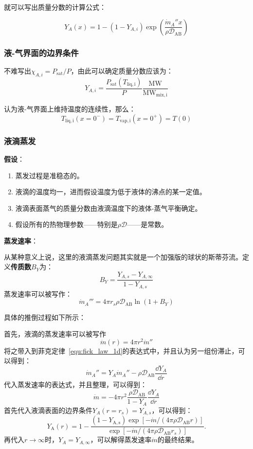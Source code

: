 就可以写出质量分数的计算公式：

\begin{equation}
    Y_A(x) = 1 - (1-Y_{A,i})\exp\left(\frac{\dot{m}_A'' x}{\rho\mathcal{D}_\mathrm{AB}}\right)
\end{equation}

\subsubsection{液-气界面的边界条件}

不难写出\(\chi_{A,i} = P_\mathrm{sat}/P\)，由此可以确定质量分数应该为：
\begin{equation}
    Y_{A,i} = \frac{P_\mathrm{sat}(T_\mathrm{liq, i})}{P}\frac{\mathrm{MW}}{\mathrm{MW}_\mathrm{mix, i}}
\end{equation}

认为液-气界面上维持温度的连续性，那么：
\[
    T_\mathrm{liq,i}(x=0^-) = T_\mathrm{vap, i}(x=0^+) = T(0)
\]


\subsubsection{液滴蒸发}

\textbf{假设}：
{\scriptsize
    \begin{enumerate}
        \item 蒸发过程是准稳态的。
        \item 液滴的温度均一，进而假设温度为低于液体的沸点的某一定值。
        \item 液滴表面蒸气的质量分数由液滴温度下的液体-蒸气平衡确定。
        \item 假设所有的热物理参数——特别是\(\rho\mathcal{D}\)——是常数。
    \end{enumerate}
}

\textbf{蒸发速率}：

从某种意义上说，这里的液滴蒸发问题其实就是一个加强版的球状的斯蒂芬流。定义\textbf{传质数}\(B_Y\)为：
\begin{equation}
    B_Y = \frac{Y_{A,s}-Y_{A,\infty}}{1 - Y_{A,s}}
\end{equation}
蒸发速率可以被写作：
\begin{equation}\label{equ:evo_rate}
    \dot{m}_A''' = {4\pi r_s \rho \mathcal{D}_\mathrm{AB}}\ln({1+B_Y})
\end{equation}

具体的推倒过程如下所示：

{
    \scriptsize\color{gray}
    首先，液滴的蒸发速率可以被写作
    \[
        \dot{m}(r) = 4\pi r^2 \dot{m}''
    \]
    将之带入到菲克定律~\ref{equ:fick_law_1d}的表达式中，并且认为另一组份滞止，可以得到：
    \[
        \dot{m}_A'' = Y_A\dot{m}_A'' - \rho\mathcal{D}_\mathrm{AB}\frac{\dd Y_A}{\dd r}
    \]
    代入蒸发速率的表达式，并且整理，可以得到：
    \[
        \dot{m}=-4\pi r^2 \frac{\rho \mathcal{D}_\mathrm{AB}}{1-Y_A}\frac{\dd Y_A}{\dd r}
    \]
    首先代入液滴表面的边界条件\(Y_A(r=r_s)=Y_{A,s}\)，可以得到：
    \[
        Y_{\mathrm{A}}(r)=1-{\frac{(1-Y_{\mathrm{A,s}})\exp[-\dot{m}/(4\pi\rho \mathcal{D}_{\mathrm{AB}}r)]}{\exp[-\dot{m}/(4\pi\rho \mathcal{D}_{\mathrm{AB}}r_{s})]}}.
    \]
    再代入\(r\to\infty\)时，\(Y_A=Y_{A,\infty}\)，可以解得蒸发速率\(\dot{m}\)的最终结果。
}

